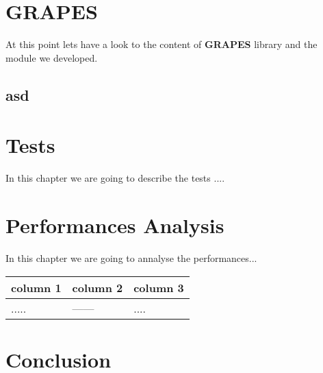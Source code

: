 \documentclass[12pt,a4paper]{report}
\begin{document}

\chapter{GRAPES}
\label{ch:grapes}
At this point lets have a look to the content of \textbf{GRAPES} library and the module we developed.

\section{asd}
\label{asd}


\chapter{Tests}
\label{ch:tests}
In this chapter we are going to describe the tests ....


\chapter{Performances Analysis}
In this chapter we are going to annalyse the performances...

\begin{center}
    \begin{tabular}{ | p{4.8cm} | p{4.8cm} | p{4.8cm} |}
    \hline
       \textbf{column 1}
         & \textbf{column 2}
         & \textbf{column 3}\\ \hline \hline
       .....
         & ------
         & .... \\ \hline
     \end{tabular}
\end{center}

\chapter{Conclusion}

\end{document}
